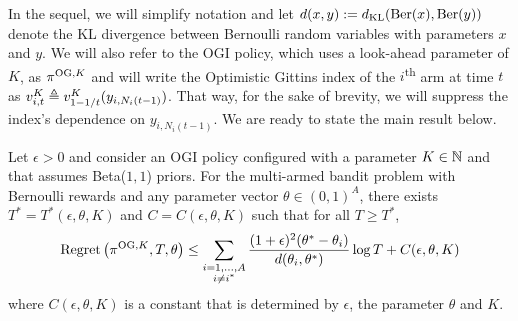 In the sequel, we will simplify notation  and let $d(x,y) := d_{\rm KL}(\text{Ber}(x),\text{Ber}(y))$ denote the KL divergence between Bernoulli random variables with parameters $x$ and $y$. We will also refer to the OGI policy, which uses a look-ahead parameter of $K$, as $\pi^{{\rm OG},K}$ and will write the Optimistic Gittins index of the $i$\textsuperscript{th} arm at time $t$ as $v^K_{i,t} \triangleq v^K_{1-1/t}(y_{i,N_i(t-1)})$. That way, for the sake of brevity, we will suppress the index's dependence on $y_{i,N_i(t-1)}$. We are ready to state the main result below.
\begin{theorem} \label{thm:frequentist_optimal_bound}
	Let $\epsilon > 0$ and consider an OGI policy configured with a parameter $K \in \mathbb{N}$ and that assumes Beta($1,1$) priors. For the multi-armed bandit problem with Bernoulli rewards and any parameter vector {\color{blue}$\theta \in (0,1)^A$}, there exists $T^* = T^*(\epsilon, \theta, K)$ and $C = C(\epsilon,\theta, K)$ such that for all $T \ge T^*$,
	\begin{equation}
	\textnormal{Regret} \left( \pi^{{\rm OG},K}, T, \theta \right) \le \sum_{\substack{i=1,\ldots,A \\ i \ne i^*}} \frac{(1+\epsilon)^2(\theta^* - \theta_i)}{d(\theta_i, \theta^*)} \log T  + C(\epsilon,\theta, K)
	\end{equation}
	where $C(\epsilon,\theta, K)$ is a constant that is determined by $\epsilon$, the parameter $\theta$ and $K$.
\end{theorem}
